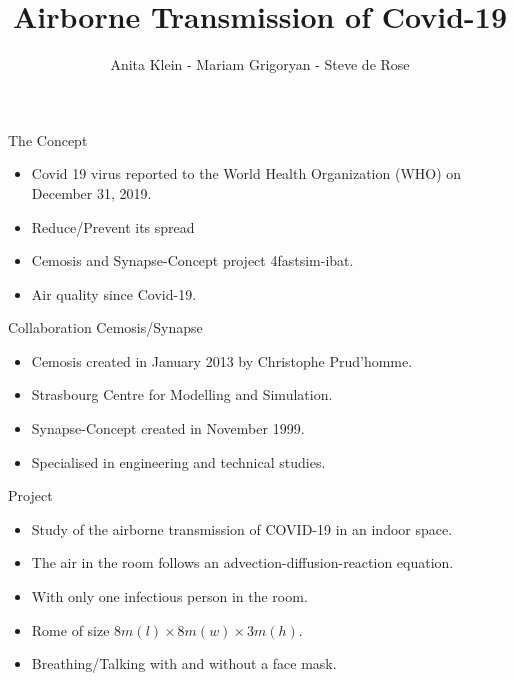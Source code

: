 \documentclass[10pt]{beamer}
\author{Anita Klein - Mariam Grigoryan - Steve de Rose}
\title{Airborne Transmission of Covid-19}
\date{}
\begin{document}
    
\begin{frame}
    \maketitle
\end{frame}

\begin{frame}{The Concept}
    \begin{itemize}
        \item Covid 19 virus reported to the World Health Organization (WHO) on December 31, 2019. 
        \item Reduce/Prevent its spread
        \item Cemosis and Synapse-Concept project 4fastsim-ibat. 
        \item Air quality since Covid-19.
    \end{itemize}
\end{frame}

\begin{frame}{Collaboration Cemosis/Synapse}
    \begin{itemize}
        \item Cemosis created in January 2013 by Christophe Prud’homme. 
        \item Strasbourg Centre for Modelling and Simulation.
        \item Synapse-Concept created in November 1999.
        \item Specialised in engineering and technical studies.
    \end{itemize}
\end{frame}

\begin{frame}{Project}
    \begin{itemize}
        \item Study of the airborne transmission of COVID-19 in an indoor space.
        \item The air in the room follows an advection-diffusion-reaction equation.
        \item With only one infectious person in the room.
        \item Rome of size $8m(l)\times 8m(w) \times 3m(h)$.
        \item Breathing/Talking with and without a face mask.
    \end{itemize}
\end{frame}
\end{document}
